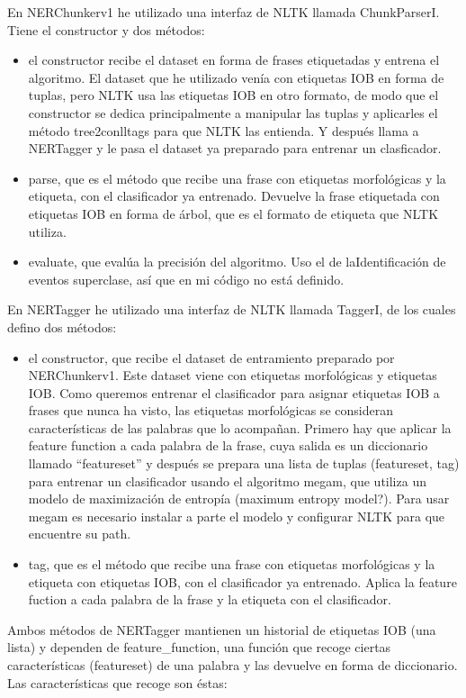 \documentclass{pre-tfg}
\begin{document}
En NERChunkerv1 he utilizado una interfaz de NLTK llamada ChunkParserI. Tiene el constructor y dos métodos:
\begin{itemize}
	\item el constructor recibe el dataset en forma de frases etiquetadas y entrena el algoritmo. El dataset que he utilizado venía con etiquetas IOB en forma de tuplas, pero NLTK usa las etiquetas IOB en otro formato, de modo que el constructor se dedica principalmente a manipular las tuplas y aplicarles el método tree2conlltags para que NLTK las entienda. Y después llama a NERTagger y le pasa el dataset ya preparado para entrenar un clasficador.
	\item parse, que es el método que recibe una frase con etiquetas morfológicas y la etiqueta, con el clasificador ya entrenado. Devuelve la frase etiquetada con etiquetas IOB en forma de árbol, que es el formato de etiqueta que NLTK utiliza.
	\item evaluate, que evalúa la precisión del algoritmo. Uso el de laIdentificación de eventos superclase, así que en mi código no está definido.
\end{itemize}


En NERTagger he utilizado una interfaz de NLTK llamada TaggerI, de los cuales defino dos métodos:

\begin{itemize}
	\item el constructor, que recibe el dataset de entramiento preparado por NERChunkerv1. Este dataset viene con etiquetas morfológicas y etiquetas IOB. Como queremos entrenar el clasificador para asignar etiquetas IOB a frases que nunca ha visto, las etiquetas morfológicas se consideran características de las palabras que lo acompañan. Primero hay que aplicar la feature function a cada palabra de la frase, cuya salida es un diccionario llamado “featureset” y después se prepara una lista de tuplas (featureset, tag) para entrenar un clasificador usando el algoritmo megam, que utiliza un modelo de maximización de entropía (maximum entropy model?). Para usar megam es necesario instalar a parte el modelo y configurar NLTK para que encuentre su path.
	\item tag, que es el método que recibe una frase con etiquetas morfológicas y la etiqueta con etiquetas IOB, con el clasificador ya entrenado. Aplica la feature fuction a cada palabra de la frase y la etiqueta con el clasificador.
\end{itemize}

Ambos métodos de NERTagger mantienen un historial de etiquetas IOB (una lista) y dependen de feature\_function, una función que recoge ciertas características (featureset) de una palabra y las devuelve en forma de diccionario. Las características que recoge son éstas:
\end{document}
